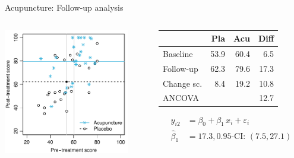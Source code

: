 \documentclass[aspectratio=169]{beamer}
\begin{document}
\begin{frame}{Acupuncture: Follow-up analysis}
\begin{columns}[T]
\begin{column}{5.5cm}
  \includegraphics[width=5.5cm]{../figures/acu-fwup}
\end{column}
%
\begin{column}{5.5cm}
  \vspace*{1em}\small
  \begin{tabular}{lrrr}
  \hline
             &  Pla &  Acu & Diff \\ \hline
  Baseline   & 53.9 & 60.4 &  6.5 \\
  Follow-up  & 62.3 & 79.6 & 17.3 \\
  Change sc. &  8.4 & 19.2 & 10.8 \\
  ANCOVA     &      &      & 12.7 \\ \hline
  \end{tabular}
\begin{align*}
         y_{i2} &= \beta_0 + \beta_1 \, x_i + \varepsilon_i \\
  \hat{\beta}_1 &= 17.3, 0.95\text{-CI: } (7.5, 27.1)
\end{align*}
\end{column}
\end{columns}
\end{frame}
\end{document}

